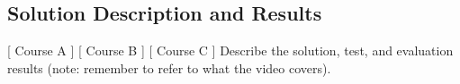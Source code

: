 \subsection{Solution Description and Results}
[ Course A ] [ Course B ] [ Course C ] 
\newline
[ Author A] [ Author B ] [ Author C ] 
\newline
Describe the solution, test, and evaluation results (note: remember to refer to what the video covers).